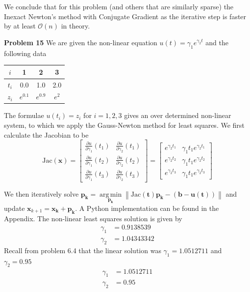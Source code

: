 \documentclass[12pt]{article}
\newcommand{\problem}[1]{\hspace{-4 ex} \large \textbf{Problem #1} }
\newcommand{\norm}[1]{\left\lVert#1\right\rVert}
\DeclareMathOperator*{\argmin}{arg\,min}
\renewcommand{\vec}[1]{\mathbf{#1}}
\begin{document}
We conclude that for this problem (and others that are similarly sparse) the Inexact Newton's method with Conjugate Gradient as the iterative step is faster by at least $\mathcal{O}(n)$ in theory.

\bigbreak

\problem{15} We are given the non-linear equation $u(t) = \gamma_1 e^{\gamma_2t}$ and the following data
\begin{center}
	\begin{tabular}{|c|c|c|c|}
		\hline
		$i$&1&2&3\\ \hline
		$t_i$&0.0&1.0&2.0\\ \hline
		$z_i$&$e^{0.1}$&$e^{0.9}$&$e^{2}$\\ \hline
	\end{tabular}
\end{center}
The formulae $u(t_i)=z_i$ for $i=1,2,3$ gives an over determined non-linear system, to which we apply the Gauss-Newton method for least squares. We first calculate the Jacobian to be
$$
\text{Jac}(\vec{x}) = \begin{bmatrix}
\frac{\partial u}{\partial \gamma_1}(t_1) & \frac{\partial u}{\partial \gamma_2}(t_1) \\
\frac{\partial u}{\partial \gamma_1}(t_2) & \frac{\partial u}{\partial \gamma_2}(t_2) \\
\frac{\partial u}{\partial \gamma_1}(t_3) & \frac{\partial u}{\partial \gamma_2}(t_3)
\end{bmatrix} = \begin{bmatrix}
e^{\gamma_2t_1} & \gamma_1 t_1e^{\gamma_2t_1} \\
e^{\gamma_2t_2} & \gamma_1 t_1e^{\gamma_2t_2} \\
e^{\gamma_2t_3} & \gamma_1 t_1e^{\gamma_2t_3}
\end{bmatrix}
$$

We then iteratively solve $\vec{p_k} = \argmin\limits_{\vec{p_k}} \norm{\text{Jac}(\vec{t})\vec{p_k} - (\vec{b}-\vec{u}(\vec{t}))}$ and update $\vec{x}_{k+1} = \vec{x_k} + \vec{p_k}$. A Python implementation can be found in the Appendix. The non-linear least squares solution is given by
\begin{align*}
\gamma_1 &= 0.9138539\\
\gamma_2 & = 1.04343342
\end{align*}
Recall from problem 6.4 that the linear solution was $\gamma_1 = 1.0512711$ and $\gamma_2 = 0.95$
\begin{align*}
\gamma_1 &= 1.0512711\\
\gamma_2 & = 0.95
\end{align*}
\bigbreak
\end{document}
